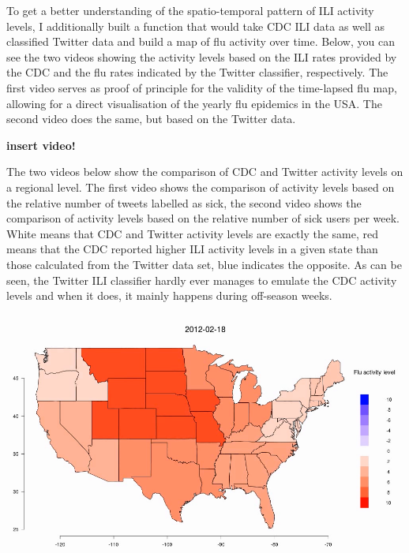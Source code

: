 \documentclass[11pt, a4paper,twoside]{report}\usepackage[]{graphicx}\usepackage[]{color}
\begin{document}
To get a better understanding of the spatio-temporal pattern of ILI activity levels, I additionally built a function that would take CDC ILI data as well as classified Twitter data and build a map of flu activity over time. Below, you can see the two videos showing the activity levels based on the ILI rates provided by the CDC and the flu rates indicated by the Twitter classifier, respectively. The first video serves as proof of principle for the validity of the time-lapsed flu map, allowing for a direct visualisation of the yearly flu epidemics in the USA. The second video does the same, but based on the Twitter data. 

\textbf{insert video!}

The two videos below show the comparison of CDC and Twitter activity levels on a regional level. The first video shows the comparison of activity levels based on the relative number of tweets labelled as sick, the second video shows the comparison of activity levels based on the relative number of sick users per week. White means that CDC and Twitter activity levels are exactly the same, red means that the CDC reported higher ILI activity levels in a given state than those calculated from the Twitter data set, blue indicates the opposite. As can be seen, the Twitter ILI classifier hardly ever manages to emulate the CDC activity levels and when it does, it mainly happens during off-season weeks.

\begin{center}
\href{run:vids/regional_Twitter_cdc_diff_full_rel_sick.avi}{\includegraphics[scale=0.5]{vids/Screenshot_Movie.png}}
\end{center}

\bigskip
\end{document}
